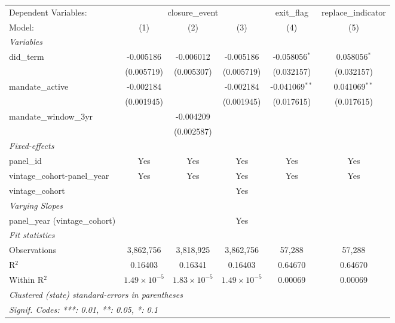 
\begingroup
\centering
\begin{tabular}{lccccc}
   \tabularnewline \midrule \midrule
   Dependent Variables: & \multicolumn{3}{c}{closure\_event} & exit\_flag & replace\_indicator\\
   Model:                          & (1)                   & (2)                   & (3)                   & (4)              & (5)\\  
   \midrule
   \emph{Variables}\\
   did\_term                       & -0.005186             & -0.006012             & -0.005186             & -0.058056$^{*}$  & 0.058056$^{*}$\\   
                                   & (0.005719)            & (0.005307)            & (0.005719)            & (0.032157)       & (0.032157)\\   
   mandate\_active                 & -0.002184             &                       & -0.002184             & -0.041069$^{**}$ & 0.041069$^{**}$\\   
                                   & (0.001945)            &                       & (0.001945)            & (0.017615)       & (0.017615)\\   
   mandate\_window\_3yr            &                       & -0.004209             &                       &                  &   \\   
                                   &                       & (0.002587)            &                       &                  &   \\   
   \midrule
   \emph{Fixed-effects}\\
   panel\_id                       & Yes                   & Yes                   & Yes                   & Yes              & Yes\\  
   vintage\_cohort-panel\_year     & Yes                   & Yes                   & Yes                   & Yes              & Yes\\  
   vintage\_cohort                 &                       &                       & Yes                   &                  & \\  
   \midrule
   \emph{Varying Slopes}\\
   panel\_year (vintage\_cohort)   &                       &                       & Yes                   &                  & \\  
   \midrule
   \emph{Fit statistics}\\
   Observations                    & 3,862,756             & 3,818,925             & 3,862,756             & 57,288           & 57,288\\  
   R$^2$                           & 0.16403               & 0.16341               & 0.16403               & 0.64670          & 0.64670\\  
   Within R$^2$                    & $1.49\times 10^{-5}$  & $1.83\times 10^{-5}$  & $1.49\times 10^{-5}$  & 0.00069          & 0.00069\\  
   \midrule \midrule
   \multicolumn{6}{l}{\emph{Clustered (state) standard-errors in parentheses}}\\
   \multicolumn{6}{l}{\emph{Signif. Codes: ***: 0.01, **: 0.05, *: 0.1}}\\
\end{tabular}
\par\endgroup


